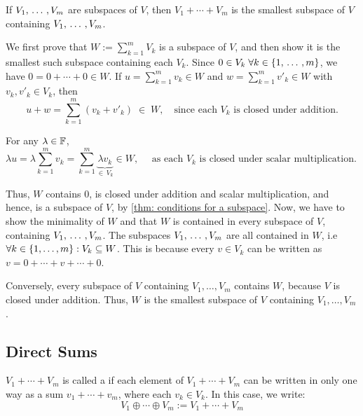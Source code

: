 \setcounter{thm}{39}
\begin{thm} 
  \label{thm: sum of subspaces is the smallest containing subspace}
  If $V_1, {\, \ldots \,\,}, V_m$ are subspaces of $V$, then $V_1 + \cdots + V_m$ is the smallest subspace of $V$ containing $V_1, {\, \ldots \,\,} , V_m$.
\end{thm}
\begin{prf}
  We first prove that $W := \sum_{k=1}^m V_k$  is a subspace of $V$,
  and then show it is the smallest such subspace
  containing each $V_k$.
  Since $0 \in V_k \;\forall k \in \{1, {\, \ldots \,\,}, m\}$, we have $0 = 0 + \cdots + 0 \in W$.
  If
  \(u = \sum_{k=1}^m v_k \in W\) and
  \(w = \sum_{k=1}^m v'_k \in W\)
  with \(v_k, v'_k\in V_k\), then
  \[
    \textstyle
    u + w = \sum_{k=1}^m (v_k + v'_k)\;\in\;W, \quad \text{since each \(V_k\) is closed under addition.}
  \]


  For any $\lambda \in \mathbb{F}$,
  \begin{equation}
      \textstyle
      \lambda u = \lambda \sum_{k=1}^m v_k =  \sum_{k=1}^m \underbrace{\lambda v_k}_{\in \, V_k}  \in W,
      \quad \text{ as each \(V_k\) is closed under scalar multiplication. }
  \end{equation}

  Thus, $W$ contains $0$, is closed under addition and scalar multiplication, and hence, is a subspace of $V$, by \ref{thm: conditions for a subspace}.
  Now, we have to show the minimality of $W$ and that $W$ is contained in every subspace of $V$, containing $V_1, {\, \ldots \,\,}, V_m$.
  The subspaces $V_1, {\, \ldots \,\,}, V_m$ are all contained in $W$, i.e $\forall k \in \{1, \dots, m \}: V_k \subseteq W$. This is because every $v \in V_k$ can be written as $v = 0 + \cdots + v + \cdots + 0$.

  Conversely, every subspace of $V$ containing $V_1, \ldots, V_m$ contains $W$, because $V$ is closed under addition. Thus, $W$ is the smallest subspace of $V$ containing $V_1, \ldots, V_m$.
\end{prf}

\subsection{Direct Sums}

\setcounter{thm}{40}
\begin{mydef}
  \label{def: direct sum}
  $V_1 + \cdots + V_m$ is called a  if each element of $V_1 +\cdots+V_m$ can be written in only one way as a sum $v_1 + \cdots + v_m$, where each $v_k \in V_k$. In this case, we write:
  \begin{equation}
    V_1 \oplus \cdots \oplus V_m := V_1 + \cdots + V_m
  \end{equation}
\end{mydef}

